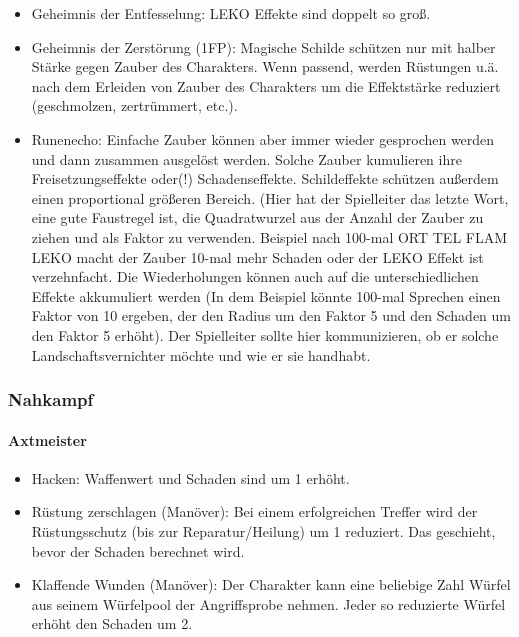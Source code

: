 \documentclass{article}
\begin{document}
\begin{itemize}
\item Geheimnis der Entfesselung: LEKO Effekte sind doppelt so groß.
\item Geheimnis der Zerstörung (1FP): Magische Schilde schützen nur mit halber Stärke gegen Zauber des Charakters. Wenn passend, werden Rüstungen u.ä. nach dem Erleiden von Zauber des Charakters um die Effektstärke reduziert (geschmolzen, zertrümmert, etc.).
\item Runenecho: Einfache Zauber können aber immer wieder gesprochen werden und dann zusammen ausgelöst werden. Solche Zauber kumulieren ihre Freisetzungseffekte oder(!) Schadenseffekte. Schildeffekte schützen außerdem einen proportional größeren Bereich. (Hier hat der Spielleiter das letzte Wort, eine gute Faustregel ist, die Quadratwurzel aus der Anzahl der Zauber zu ziehen und als Faktor zu verwenden. Beispiel nach 100-mal ORT TEL FLAM LEKO macht der Zauber 10-mal mehr Schaden oder der LEKO Effekt ist verzehnfacht. Die Wiederholungen können auch auf die unterschiedlichen Effekte akkumuliert werden (In dem Beispiel könnte 100-mal Sprechen einen Faktor von 10 ergeben, der den Radius um den Faktor 5 und den Schaden um den Faktor 5 erhöht). Der Spielleiter sollte hier kommunizieren, ob er solche Landschaftsvernichter möchte und wie er sie handhabt.
\end{itemize}

\subsubsection{Nahkampf}

\paragraph{Axtmeister}

\begin{itemize}
\item Hacken: Waffenwert und Schaden sind um 1 erhöht.
\item Rüstung zerschlagen (Manöver): Bei einem erfolgreichen Treffer wird der Rüstungsschutz (bis zur Reparatur/Heilung) um 1 reduziert. Das geschieht, bevor der Schaden berechnet wird.
\item Klaffende Wunden (Manöver): Der Charakter kann eine beliebige Zahl Würfel aus seinem Würfelpool der Angriffsprobe nehmen. Jeder so reduzierte Würfel erhöht den Schaden um 2.
\end{itemize}
\end{document}
